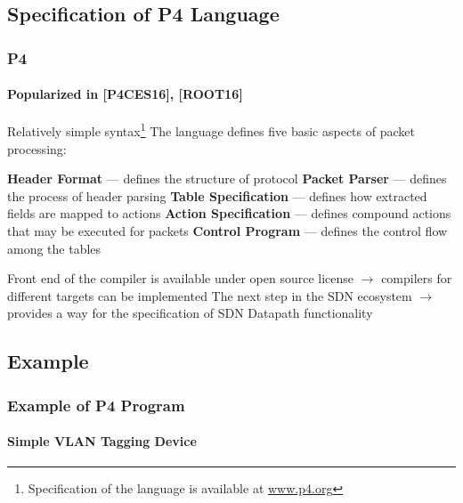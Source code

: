 \subsection*{Specification of P4 Language}
\begin{frame}
    \frametitle{P4} 
    \framesubtitle{Popularized in  [P4CES16], [ROOT16]}
    \begin{itemize} 
        \fitem Relatively simple syntax\footnote{Specification of the language is available at \url{www.p4.org}}
        \fitem The language defines five basic aspects of packet processing:
        \begin{enumerate}
            \fitem \textbf{Header Format} --- defines the structure of protocol
            \fitem \textbf{Packet Parser} --- defines the process of header parsing
            \fitem \textbf{Table Specification} --- defines how extracted fields are mapped to actions
            \fitem \textbf{Action Specification} --- defines compound actions that may be executed for packets
            \fitem \textbf{Control Program} --- defines the control flow among the tables
        \end{enumerate} 
        \fitem Front end of the compiler is available under open source license 
        $\rightarrow$ compilers for different targets can be implemented      
        \fitem The next step in the SDN ecosystem $\rightarrow$ provides a way for the specification
        of SDN Datapath functionality
    \end{itemize}
\end{frame}

\subsection*{Example}
\begin{frame}
    \frametitle{Example of P4 Program}
    \framesubtitle{Simple VLAN Tagging Device}
    
\end{frame}